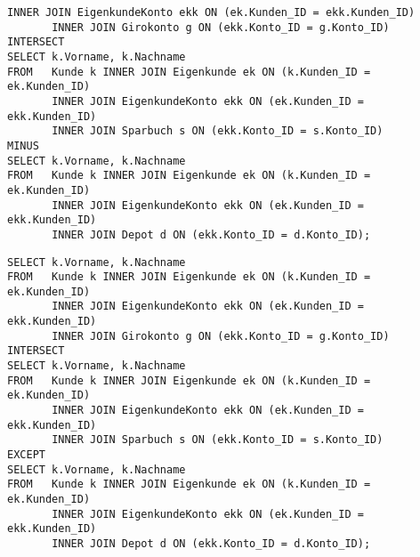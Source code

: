 \begin{enumerate}
\begin{lstlisting}[language=oracle_sql]
       INNER JOIN EigenkundeKonto ekk ON (ek.Kunden_ID = ekk.Kunden_ID)
       INNER JOIN Girokonto g ON (ekk.Konto_ID = g.Konto_ID)
INTERSECT
SELECT k.Vorname, k.Nachname
FROM   Kunde k INNER JOIN Eigenkunde ek ON (k.Kunden_ID = ek.Kunden_ID)
       INNER JOIN EigenkundeKonto ekk ON (ek.Kunden_ID = ekk.Kunden_ID)
       INNER JOIN Sparbuch s ON (ekk.Konto_ID = s.Konto_ID)
MINUS
SELECT k.Vorname, k.Nachname
FROM   Kunde k INNER JOIN Eigenkunde ek ON (k.Kunden_ID = ek.Kunden_ID)
       INNER JOIN EigenkundeKonto ekk ON (ek.Kunden_ID = ekk.Kunden_ID)
       INNER JOIN Depot d ON (ekk.Konto_ID = d.Konto_ID);
        \end{lstlisting}
\clearpage
        \begin{mssql}[\FALSE]
        \end{mssql}
        \begin{lstlisting}[language=ms_sql]
SELECT k.Vorname, k.Nachname
FROM   Kunde k INNER JOIN Eigenkunde ek ON (k.Kunden_ID = ek.Kunden_ID)
       INNER JOIN EigenkundeKonto ekk ON (ek.Kunden_ID = ekk.Kunden_ID)
       INNER JOIN Girokonto g ON (ekk.Konto_ID = g.Konto_ID)
INTERSECT
SELECT k.Vorname, k.Nachname
FROM   Kunde k INNER JOIN Eigenkunde ek ON (k.Kunden_ID = ek.Kunden_ID)
       INNER JOIN EigenkundeKonto ekk ON (ek.Kunden_ID = ekk.Kunden_ID)
       INNER JOIN Sparbuch s ON (ekk.Konto_ID = s.Konto_ID)
EXCEPT
SELECT k.Vorname, k.Nachname
FROM   Kunde k INNER JOIN Eigenkunde ek ON (k.Kunden_ID = ek.Kunden_ID)
       INNER JOIN EigenkundeKonto ekk ON (ek.Kunden_ID = ekk.Kunden_ID)
       INNER JOIN Depot d ON (ekk.Konto_ID = d.Konto_ID);
        \end{lstlisting}
      \end{enumerate}
\clearpage
